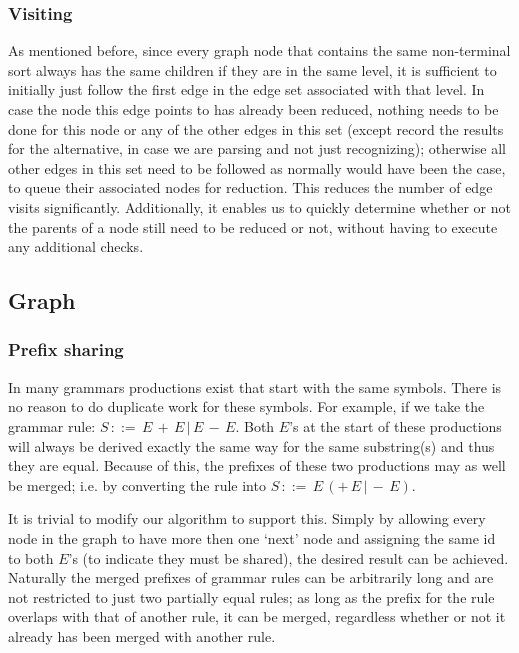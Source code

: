 \documentclass[a4paper,10pt]{article}
\begin{document}
\subsubsection{Visiting}
\label{subsec:edgeVisitOptimization}
As mentioned before, since every graph node that contains the same non-terminal sort always has the same children if they are in the same level, it is sufficient to initially just follow the first edge in the edge set associated with that level. In case the node this edge points to has already been reduced, nothing needs to be done for this node or any of the other edges in this set (except record the results for the alternative, in case we are parsing and not just recognizing); otherwise all other edges in this set need to be followed as normally would have been the case, to queue their associated nodes for reduction. This reduces the number of edge visits significantly. Additionally, it enables us to quickly determine whether or not the parents of a node still need to be reduced or not, without having to execute any additional checks.

\subsection{Graph}

\subsubsection{Prefix sharing}
\label{sec:prefixSharing}
In many grammars productions exist that start with the same symbols. There is no reason to do duplicate work for these symbols. For example, if we take the grammar rule: $S\,::=\,E\,+\,E\,|\,E\,-\,E$. Both $E$'s at the start of these productions will always be derived exactly the same way for the same substring(s) and thus they are equal. Because of this, the prefixes of these two productions may as well be merged; i.e. by converting the rule into $S\,::=\,E\,(+\,E\,|\,-\,E)$.

It is trivial to modify our algorithm to support this. Simply by allowing every node in the graph to have more then one `next' node and assigning the same id to both $E$'s (to indicate they must be shared), the desired result can be achieved. Naturally the merged prefixes of grammar rules can be arbitrarily long and are not restricted to just two partially equal rules; as long as the prefix for the rule overlaps with that of another rule, it can be merged, regardless whether or not it already has been merged with another rule.
\end{document}
